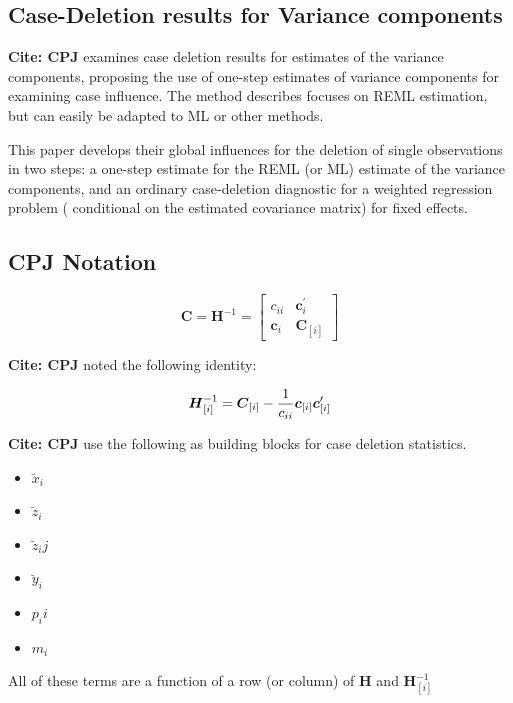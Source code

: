 \documentclass[12pt, a4paper]{article}
\theoremstyle{plain}
\theoremstyle{definition}
\theoremstyle{remark}
\begin{document}
\subsection{Case-Deletion results for Variance components}
\textbf{Cite: CPJ}  examines case deletion results for estimates of the variance components, proposing the use of one-step estimates of variance components for examining case influence. The method describes focuses on REML estimation, but can easily be adapted to ML or other methods.

This paper develops their global influences for the deletion of single observations in two steps: a one-step estimate for the REML (or ML) estimate of the variance components, and an ordinary case-deletion diagnostic for a weighted regression problem ( conditional on the estimated covariance matrix) for fixed effects.


\subsection{CPJ Notation} %

\[ \boldsymbol{C} = \boldsymbol{H}^{-1} = \left[
\begin{array}{cc}
c_{ii} & \boldsymbol{c}_{i}^{\prime}\\
\boldsymbol{c}_{i} &  \boldsymbol{C}_{[i]}
\end{array} \right]
\]

\textbf{Cite: CPJ}  noted the following identity:

\[ \boldsymbol{H}_{[i]}^{-1}  = \boldsymbol{C}_{[i]} - {1 \over c_{ii}}\boldsymbol{c}_{[i]}\boldsymbol{c}_{[i]}^{\prime} \]


\textbf{Cite: CPJ} use the following as building blocks for case deletion statistics.
\begin{itemize}
\item $\breve{x}_i$
\item $\breve{z}_i$
\item $\breve{z}_ij$
\item $\breve{y}_i$
\item $p_ii$
\item $m_i$
\end{itemize}
All of these terms are a function of a row (or column) of $\boldsymbol{H}$ and $\boldsymbol{H}_{[i]}^{-1}$





\end{document}
